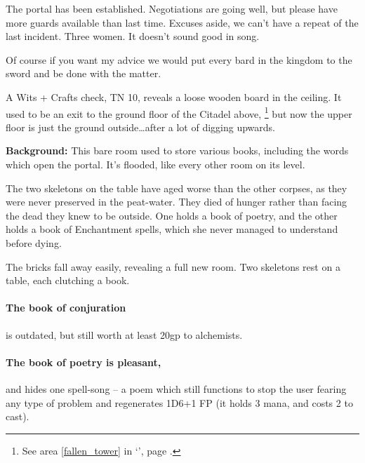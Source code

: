 \begin{multicols}{2}
\begin{exampletext}
\end{exampletext}

\begin{exampletext}

  The portal has been established.  Negotiations are going well, but please have more guards available than last time.  Excuses aside, we can't have a repeat of the last incident.  Three women.  It doesn't sound good in song.

  Of course if you want my advice we would put every bard in the kingdom to the sword and be done with the matter.

\end{exampletext}

A Wits + Crafts check, TN 10, reveals a loose wooden board in the ceiling.
It used to be an exit to the ground floor of the Citadel above,%
\footnote{See area \ref{fallen_tower} in `', page \pageref{fallen_tower}.}
but now the upper floor is just the ground outside\ldots after a lot of digging upwards.


\textbf{Background:}
This bare room used to store various books, including the words which open the portal.
It's flooded, like every other room on its level.

The two skeletons on the table have aged worse than the other corpses, as they were never preserved in the peat-water.
They died of hunger rather than facing the dead they knew to be outside.
One holds a book of poetry, and the other holds a book of Enchantment spells, which she never managed to understand before dying.

\begin{boxtext}

  The bricks fall away easily, revealing a full new room.  Two skeletons rest on a table, each clutching a book.

\end{boxtext}

\paragraph{The book of conjuration}
is outdated, but still worth at least 20gp to \gls{alchemists}.

\paragraph{The book of poetry is pleasant,}
and hides one spell-song -- a poem which still functions to stop the user fearing any type of problem and regenerates 1D6+1 FP (it holds 3 mana, and costs 2 to cast).


\end{multicols}
